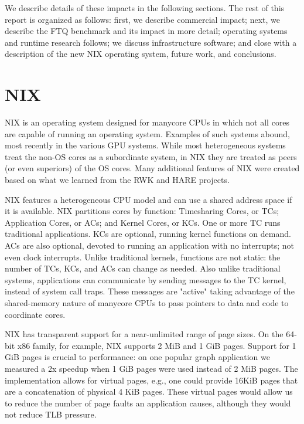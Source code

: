 \documentclass{report}
\begin{document}
We describe details of these impacts in the following sections. The rest of this 
report is organized as follows: first, we describe commercial impact; next, 
we describe the FTQ benchmark and its impact in more detail; operating systems
and runtime research follows; we discuss infrastructure software; and close with a 
description of the new NIX  operating system, future work, and conclusions. 






\chapter{NIX}

NIX is an operating system designed for manycore CPUs in which not 
all cores are capable of running an operating system. Examples of such 
systems abound, most recently in the various GPU systems. While most 
heterogeneous systems treat the non-OS cores as a subordinate system, 
in NIX they are treated as peers (or even superiors) of the 
OS cores. 
Many  additional features of NIX were created based on what we learned from 
the RWK and HARE projects. 

NIX
features a heterogeneous CPU model and can use a shared address space
if it is available. 
NIX partitions cores by function: Timesharing Cores, or
TCs; Application Cores, or ACs; and Kernel Cores, or KCs.  One or more
TC runs traditional applications.  KCs are optional, running kernel
functions on demand.  ACs are also optional, devoted to running an
application with no interrupts; not even clock interrupts.  Unlike
traditional kernels, functions are not static: the number of TCs, KCs,
and ACs can change as needed.  Also unlike traditional
systems, applications can communicate by sending messages to the TC
kernel, instead of system call traps.  These messages are "active"
taking advantage of the shared-memory nature of manycore CPUs to pass
pointers to data and code to coordinate cores.

NIX has transparent support for a near-unlimited range of page sizes. 
On the 64-bit x86 family, for example, NIX supports 2 MiB and 1 GiB pages. 
Support for 1 GiB pages is crucial to performance: on one popular 
graph application we measured a 2x speedup when 1 GiB pages were used 
instead of 2 MiB pages. 
The implementation allows for virtual pages, e.g., one could 
provide 16KiB pages that are a concatenation of physical 4 KiB pages. 
These virtual pages would allow us to reduce the number of page 
faults an application causes, although they would not reduce 
TLB pressure. 
\end{document}
